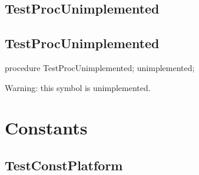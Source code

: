 \documentclass{report}
\newif\ifpdf
\begin{document}
\subsection*{\large{\textbf{TestProcUnimplemented}}\normalsize\hspace{1ex}\hrulefill}
\else
\subsection*{TestProcUnimplemented}
\fi
\label{ok_hint_directives-TestProcUnimplemented}
\begin{list}{}{
\setlength{\itemindent}{0cm}
\setlength{\listparindent}{0cm}
\setlength{\leftmargin}{\evensidemargin}
\addtolength{\leftmargin}{\tmplength}
\settowidth{\labelsep}{X}
\addtolength{\leftmargin}{\labelsep}
\setlength{\labelwidth}{\tmplength}
}
\item[\textbf{Declaration}\hfill]
\ifpdf
\begin{flushleft}
\fi
\begin{ttfamily}
procedure TestProcUnimplemented; unimplemented;\end{ttfamily}

\ifpdf
\end{flushleft}
\fi

\par
\item[\textbf{Description}]
Warning: this symbol is unimplemented.

 

\end{list}
\section{Constants}
\ifpdf
\subsection*{\large{\textbf{TestConstPlatform}}\normalsize\hspace{1ex}\hrulefill}
\else
\end{document}
